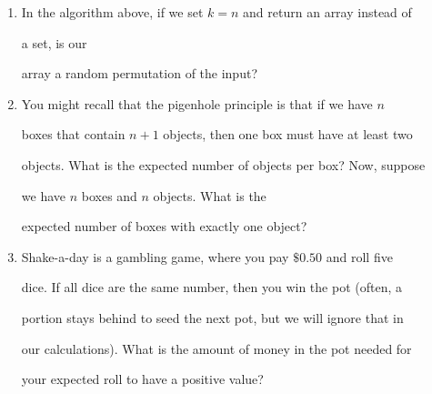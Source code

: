 \documentclass{article}
\begin{document}
\begin{enumerate}

    \item In the algorithm above, if we set $k=n$ and return an array instead of

        a set, is our

        array a random permutation of the input?

    \item You might recall that the pigenhole principle is that if we have $n$

        boxes that contain $n+1$ objects, then one box must have at least two

        objects.  What is the expected number of objects per box?  Now, suppose

        we have $n$ boxes and $n$ objects.  What is the

        expected number of boxes with exactly one object?

    \item Shake-a-day is a gambling game, where you pay $\$0.50$ and roll five

        dice.  If all dice are the same number, then you win the pot (often, a

        portion stays behind to seed the next pot, but we will ignore that in

        our calculations).  What is the amount of money in the pot needed for

        your expected roll to have a positive value?

\end{enumerate}
\end{document}
